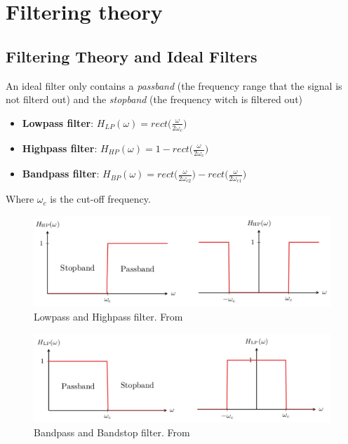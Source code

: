 
\newpage
\section{Filtering theory}
\subsection{Filtering Theory and Ideal Filters}
An ideal filter only contains a \textit{passband} (the frequency range that the signal is not filterd out) 
and the \textit{stopband} (the frequency witch is filtered out)

\begin{itemize}
    \item \textbf{Lowpass filter}:
    $H_{LP}(\omega) = rect\big( \frac{\omega}{2\omega_c} \big)$
    \item \textbf{Highpass filter}:
    $H_{HP}(\omega) = 1-rect\big( \frac{\omega}{2\omega_c} \big)$
    \item \textbf{Bandpass filter}:
    $H_{BP}(\omega) = rect\big( \frac{\omega}{2\omega_{c2}} \big) - rect\big( \frac{\omega}{2\omega_{c1}} \big)$
\end{itemize}
Where $\omega_c$ is the cut-off frequency.

\begin{figure}[!ht]
    \centering
    \includegraphics[width=12cm]{image/filter-lp-hp.pdf}
    \caption{Lowpass and Highpass filter. From \cite{}}
    \label{fig:filter-lp-hp}
\end{figure}

\begin{figure}[!ht]
    \centering
    \includegraphics[width=12cm]{image/filter-bp-bs.pdf}
    \caption{Bandpass and Bandstop filter. From \cite{}}
    \label{fig:filter-bp-bs}
\end{figure}


